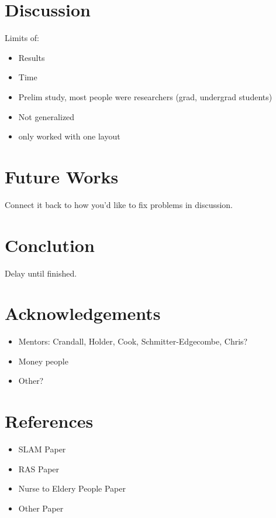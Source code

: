 \documentclass[11pt, draft, a4paper]{IEEEtran}
\begin{document}
\section{Discussion}
Limits of:
\begin{itemize}
    \item Results
    \item Time
    \item Prelim study, most people were researchers (grad, undergrad students)
    \item Not generalized
    \item only worked with one layout
\end{itemize}


\section{Future Works}
Connect it back to how you'd like to fix problems in discussion.


\section{Conclution}
Delay until finished.


\section{Acknowledgements}
\begin{itemize}
    \item Mentors: Crandall, Holder, Cook, Schmitter-Edgecombe, Chris?
    \item Money people
    \item Other?
\end{itemize}


\section{References}
\begin{itemize}
    \item SLAM Paper
    \item RAS Paper
    \item Nurse to Eldery People Paper
    \item Other Paper
\end{itemize}
\end{document}
